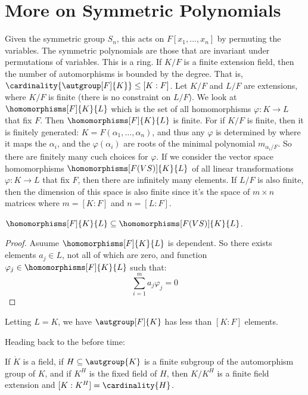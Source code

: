 \documentclass{article}                                                        %
\begin{document}
    \section{More on Symmetric Polynomials}
        Given the symmetric group $S_{n}$, this acts on $F[x_{1},\dots,x_{n}]$
        by permuting the variables. The symmetric polynomials are those that are
        invariant under permutations of variables. This is a ring.
        If $K/F$ is a finite extension field, then the number of automorphisms
        is bounded by the degree. That is,
        $\cardinality{\autgroup[F]{K}}\leq[K:F]$. Let $K/F$ and $L/F$ are
        extensions, where $K/F$ is finite (there is no constraint on $L/F$). We
        look at $\homomorphisms[F]{K}{L}$ which is the set of all homomorphisms
        $\varphi:K\rightarrow{L}$ that fix $F$. Then $\homomorphisms[F]{K}{L}$
        is finite. For if $K/F$ is finite, then it is finitely generated:
        $K=F(\alpha_{1},\dots,\alpha_{n})$, and thus any $\varphi$ is determined
        by where it maps the $\alpha_{i}$, and the $\varphi(\alpha_{i})$ are
        roots of the minimal polynomial $m_{\alpha_{i}/F}$. So there are
        finitely many cuch choices for $\varphi$. If we consider the vector
        space homomorphisms $\homomorphisms[F(VS)]{K}{L}$ of all linear
        transformations $\varphi:K\rightarrow{L}$ that fix $F$, then there are
        infinitely many elements. If $L/F$ is also finite, then the dimension
        of this space is also finite since it's the space of $m\times{n}$
        matrices where $m=[K:F]$ and $n=[L:F]$.
        \begin{theorem}
            $\homomorphisms[F]{K}{L}\subseteq\homomorphisms[F(VS)]{K}{L}$.
        \end{theorem}
        \begin{proof}
            Asuume $\homomorphisms[F]{K}{L}$ is dependent. So there exists
            elements $a_{j}\in{L}$, not all of which are zero, and function
            $\varphi_{j}\in\homomorphisms[F]{K}{L}$ such that:
            \begin{equation}
                \sum_{i=1}^{m}a_{j}\varphi_{j}=0
            \end{equation}
        \end{proof}
        \begin{theorem}
            Letting $L=K$, we have $\autgroup[F]{K}$ has less than $[K:F]$
            elements.
        \end{theorem}
        Heading back to the before time:
        \begin{theorem}
            If $\ring{K}$ is a field, if $H\subseteq\autgroup{K}$ is a finite
            subgroup of the automorphism group of $K$, and if $K^{H}$ is the
            fixed field of $H$, then $K/K^{H}$ is a finite field extension and
            $[K:K^{H}]=\cardinality{H}$.
        \end{theorem}
\end{document}

